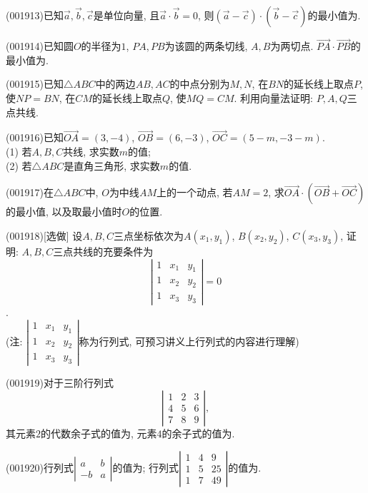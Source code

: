\item (001913)已知$\overrightarrow{a},\overrightarrow{b},\overrightarrow{c}$是单位向量, 且$\overrightarrow{a}\cdot\overrightarrow{b}=0$, 则$(\overrightarrow{a}-\overrightarrow{c})\cdot(\overrightarrow{b}-\overrightarrow{c})$的最小值为.
\item (001914)已知圆$O$的半径为$1$, $PA,PB$为该圆的两条切线, $A,B$为两切点. $\overrightarrow{PA}\cdot\overrightarrow{PB}$的最小值为.
\item (001915)已知$\triangle ABC$中的两边$AB,AC$的中点分别为$M,N$, 在$BN$的延长线上取点$P$, 使$NP=BN$, 在$CM$的延长线上取点$Q$, 使$MQ=CM$. 利用向量法证明: $P,A,Q$三点共线.
\item (001916)已知$\overrightarrow{OA}=(3,-4)$, $\overrightarrow{OB}=(6,-3)$, $\overrightarrow{OC}=(5-m,-3-m)$.\\ 
(1) 若$A,B,C$共线, 求实数$m$的值;\\ 
(2) 若$\triangle ABC$是直角三角形, 求实数$m$的值.
\item (001917)在$\triangle ABC$中, $O$为中线$AM$上的一个动点, 若$AM=2$, 求$\overrightarrow{OA}\cdot(\overrightarrow{OB}+\overrightarrow{OC})$的最小值, 以及取最小值时$O$的位置.
\item (001918)[选做]
设$A,B,C$三点坐标依次为$A(x_1,y_1)$, $B(x_2,y_2)$, $C(x_3,y_3)$, 证明: $A, B, C$三点共线的充要条件为
$$\left|\begin{array}{ccc}1&x_1&y_1\\1&x_2&y_2\\1&x_3&y_3\end{array}\right|=0$$.\\ 
(注: $\left|\begin{array}{ccc}1&x_1&y_1\\1&x_2&y_2\\1&x_3&y_3\end{array}\right|$称为行列式, 可预习讲义上行列式的内容进行理解)
\item (001919)对于三阶行列式
$$\left|\begin{array}{ccc}1 & 2& 3\\4& 5&6\\7&8&9\end{array}\right|,$$
其元素$2$的代数余子式的值为, 元素$4$的余子式的值为.
\item (001920)行列式$\left|\begin{array}{cc}a & b \\ -b & a\end{array}\right|$的值为;
行列式$\left|\begin{array}{ccc}1 & 4 & 9\\1 & 5 & 25\\1 & 7 & 49\end{array}\right|$的值为.
